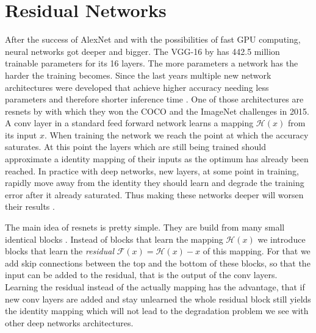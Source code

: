 \section{Residual Networks}
\label{sec:concepts:resnet}
After the success of AlexNet \citep{krizhevsky_imagenet_2012} and with the possibilities of fast GPU computing, neural networks got deeper and bigger.
The VGG-16 by \citet{simonyan_very_2014} has 442.5 million trainable parameters for its 16 layers. The more parameters a network has the harder the training becomes.
Since the last years multiple new network architectures were developed that achieve higher accuracy needing less parameters and therefore shorter inference time \citep{canziani_analysis_2016}. One of those architectures are \glspl{resnet} by \citet{he_deep_2016} with which they won the COCO  \citet{lin_microsoft_2014} and the ImageNet \citet{russakovsky_imagenet_2015}  challenges in 2015.
A \gls{conv} layer in a standard feed forward network learns a mapping $\mathcal{H}(x)$ from its input $x$. When training the network we reach the point at which the accuracy saturates. At this point the layers which are still being trained should approximate a identity mapping of their inputs as the optimum has already been reached. In practice with deep networks, new layers, at some point in training, rapidly move away from the identity they should learn and degrade the training error after it already saturated. Thus making these networks deeper will worsen their results \citep{he_convolutional_2015}.


The main idea of \glspl{resnet} is pretty simple. They are build from many small identical blocks . Instead of blocks that learn the mapping $\mathcal{H}(x)$ we introduce blocks that learn the \textit{residual} $\mathcal{F}(x) = \mathcal{H}(x) - x$ of this mapping. For that we add skip connections between the top and the bottom of these blocks, so that the input can be added to the residual, that is the output of the \gls{conv} layers. Learning the residual instead of the actually mapping has the advantage, that if new \gls{conv} layers are added and stay unlearned the whole residual block still yields the identity mapping which will not lead to the degradation problem we see with other deep networks architectures.

